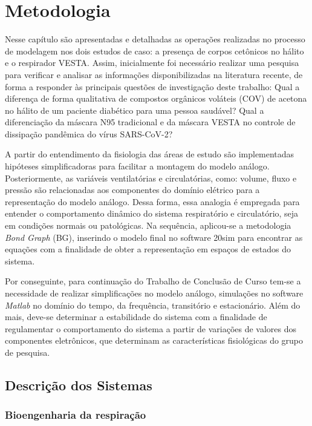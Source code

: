 \chapter[Metodologia]{Metodologia}

Nesse capítulo são apresentadas e detalhadas as operações realizadas no processo de modelagem nos dois estudos de caso: a presença de corpos cetônicos no hálito e o respirador VESTA. Assim, inicialmente foi necessário realizar uma pesquisa para verificar e analisar as informações disponibilizadas na literatura recente, de forma a responder às principais questões de investigação deste trabalho: Qual a diferença de forma qualitativa de compostos orgânicos voláteis (COV) de acetona no hálito de um paciente diabético para uma pessoa saudável? Qual a diferenciação da máscara N95 tradicional e da máscara VESTA no controle de dissipação pandêmica do vírus SARS-CoV-2?

A partir do entendimento da fisiologia das áreas de estudo são implementadas hipóteses simplificadoras para facilitar a montagem do modelo análogo. Posteriormente, as variáveis ventilatórias e circulatórias, como: volume, fluxo e pressão são relacionadas aos componentes do domínio elétrico para a representação do modelo análogo. Dessa forma, essa analogia é empregada para entender o comportamento dinâmico do sistema respiratório e circulatório, seja em condições normais ou patológicas. Na sequência, aplicou-se a metodologia \textit{Bond Graph} (BG), inserindo o modelo final no software 20sim para encontrar as equações com a finalidade de obter a representação em espaços de estados do sistema.

Por conseguinte, para continuação do Trabalho de Conclusão de Curso tem-se a necessidade de realizar simplificações no modelo análogo, simulações no software \textit{Matlab} no domínio do tempo, da frequência, transitório e estacionário. Além do mais, deve-se determinar a estabilidade do sistema com a finalidade de regulamentar o comportamento do sistema a partir de variações de valores dos componentes eletrônicos, que determinam as características fisiológicas do grupo de pesquisa.    

\section{Descrição dos Sistemas}
\subsection{Bioengenharia da respiração}
